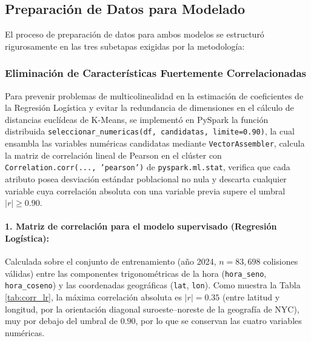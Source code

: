 \subsection{Preparación de Datos para Modelado}
\label{subsec:prep_modelado_num4}

El proceso de preparación de datos para ambos modelos se estructuró rigurosamente en las tres subetapas exigidas por la metodología:

\subsubsection{Eliminación de Características Fuertemente Correlacionadas}
\label{subsubsec:num4a_correlacion}

Para prevenir problemas de multicolinealidad en la estimación de coeficientes de la Regresión Logística y evitar la redundancia de dimensiones en el cálculo de distancias euclídeas de K-Means, se implementó en PySpark la función distribuida \texttt{seleccionar\_numericas(\allowbreak df, candidatas, limite=0.90)}, la cual ensambla las variables numéricas candidatas mediante \texttt{VectorAssembler}, calcula la matriz de correlación lineal de Pearson en el clúster con \texttt{Correlation.corr(..., 'pearson')} de \texttt{pyspark.ml.stat}, verifica que cada atributo posea desviación estándar poblacional no nula y descarta cualquier variable cuya correlación absoluta con una variable previa supere el umbral $|r| \ge 0.90$.

\paragraph{1. Matriz de correlación para el modelo supervisado (Regresión Logística):}
Calculada sobre el conjunto de entrenamiento (año 2024, $n = 83,698$ colisiones válidas) entre las componentes trigonométricas de la hora (\texttt{hora\_seno}, \texttt{hora\_coseno}) y las coordenadas geográficas (\texttt{lat}, \texttt{lon}). Como muestra la Tabla \ref{tab:corr_lr}, la máxima correlación absoluta es $|r| = 0.35$ (entre latitud y longitud, por la orientación diagonal suroeste--noreste de la geografía de NYC), muy por debajo del umbral de $0.90$, por lo que se conservan las cuatro variables numéricas.

